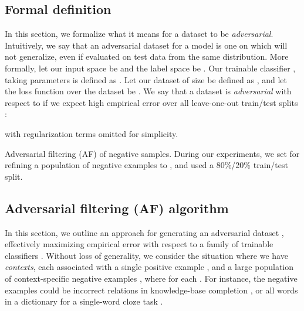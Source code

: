 \documentclass[11pt,a4paper]{article}
\begin{document}
\subsection{Formal definition}
In this section, we formalize what it means for a dataset to be \emph{adversarial}. Intuitively, we say that an adversarial dataset for a model  is one on which  will not generalize, even if evaluated on test data from the same distribution. 
More formally, let our input space be  and the label space be . Our trainable classifier , taking parameters  is defined as . Let our dataset of size  be defined as ,  and let the loss function over the dataset be . We say that a dataset is \emph{adversarial} with respect to  if we expect high empirical error  over all leave-one-out train/test splits \cite{vapnik_nature_2000}:

{\setlength{\abovedisplayskip}{-11pt}
\setlength{\belowdisplayskip}{0pt}
\setlength{\abovedisplayshortskip}{0pt}
\setlength{\belowdisplayshortskip}{0pt}

}
with regularization terms omitted for simplicity.
\begin{algorithm}[t]
\caption{\small Adversarial filtering (AF) of negative samples. During our experiments, we set  for refining a population of  negative examples to , and used a 80\%/20\% train/test split.}
\begin{algorithmic}
\label{alg:adversarialfiltering}
    
   \ENDFOR
  \ENDWHILE
\end{algorithmic}
\end{algorithm}
\vspace{-1mm}
\subsection{Adversarial filtering (AF) algorithm}
In this section, we outline an approach for generating an adversarial dataset , effectively maximizing empirical error  with respect to a family of trainable classifiers . Without loss of generality, we consider the situation where we have  \emph{contexts}, each associated with a single positive example , and a large population of context-specific negative examples , where  for each . For instance, the negative examples could be incorrect relations in knowledge-base completion \cite{socher2013reasoning}, or all words in a dictionary for a single-word cloze task \cite{zweig2011microsoft}.
\end{document}
